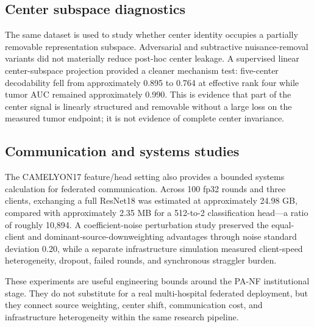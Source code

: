\subsection{Center subspace diagnostics}
The same dataset is used to study whether center identity occupies a partially removable representation subspace. Adversarial and subtractive nuisance-removal variants did not materially reduce post-hoc center leakage. A supervised linear center-subspace projection provided a cleaner mechanism test: five-center decodability fell from approximately 0.895 to 0.764 at effective rank four while tumor AUC remained approximately 0.990. This is evidence that part of the center signal is linearly structured and removable without a large loss on the measured tumor endpoint; it is not evidence of complete center invariance.

\subsection{Communication and systems studies}
The CAMELYON17 feature/head setting also provides a bounded systems calculation for federated communication. Across 100 fp32 rounds and three clients, exchanging a full ResNet18 was estimated at approximately 24.98 GB, compared with approximately 2.35 MB for a 512-to-2 classification head---a ratio of roughly 10,894. A coefficient-noise perturbation study preserved the equal-client and dominant-source-downweighting advantages through noise standard deviation 0.20, while a separate infrastructure simulation measured client-speed heterogeneity, dropout, failed rounds, and synchronous straggler burden.

These experiments are useful engineering bounds around the PA-NF institutional stage. They do not substitute for a real multi-hospital federated deployment, but they connect source weighting, center shift, communication cost, and infrastructure heterogeneity within the same research pipeline.
